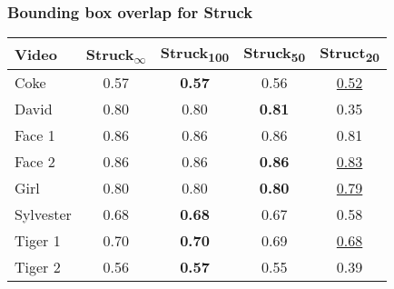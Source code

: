 
\begin{frame}
    \frametitle{Bounding box overlap for Struck}
    \begin{tabular}{l c c c c }
        \toprule
        Video & Struck\textsubscript{$\infty$} & Struck\textsubscript{100} & Struck\textsubscript{50} & Struct\textsubscript{20} \\
        \midrule
        Coke      & 0.57 & \textbf{0.57} &         0.56  & \underline{0.52} \\
        David     & 0.80 &         0.80  & \textbf{0.81} &            0.35  \\
        Face 1    & 0.86 &         0.86  &         0.86  &            0.81  \\
        Face 2    & 0.86 &         0.86  & \textbf{0.86} & \underline{0.83} \\
        Girl      & 0.80 &         0.80  & \textbf{0.80} & \underline{0.79} \\
        Sylvester & 0.68 & \textbf{0.68} &         0.67  &            0.58  \\
        Tiger 1   & 0.70 & \textbf{0.70} &         0.69  & \underline{0.68} \\
        Tiger 2   & 0.56 & \textbf{0.57} &         0.55  &            0.39  \\
        \bottomrule
    \end{tabular}
\end{frame}

